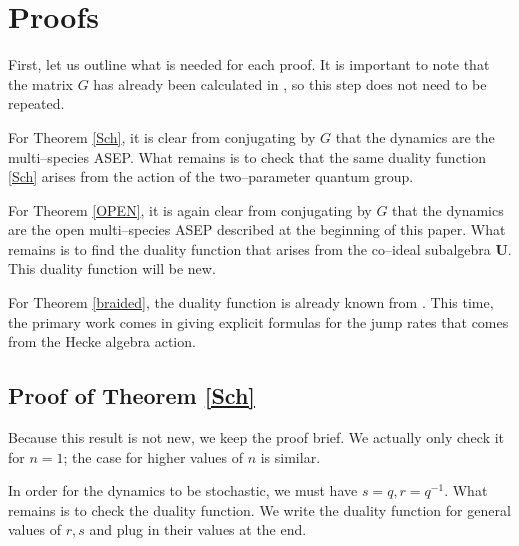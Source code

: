 \documentclass[12pt]{ximera}
\begin{document}
\section{Proofs}
First, let us outline what is needed for each proof. It is important to note that the matrix $G$ has already been calculated in \cite{KIMRN}, so this step does not need to be repeated. 

For Theorem \ref{Sch}, it is clear from conjugating by $G$ that the dynamics are the multi--species ASEP. What remains is to check that the same duality function \eqref{Sch} arises from the action of the two--parameter quantum group. 

For Theorem \ref{OPEN}, it is again clear from conjugating by $G$ that the dynamics are the open multi--species ASEP described at the beginning of this paper. What remains is to find the duality function that arises from the co--ideal subalgebra $\mathbf{U}$. This duality function will be new. 

For Theorem \ref{braided}, the duality function is already known from \cite{CGRS}. This time, the primary work comes in giving explicit formulas for the jump rates that comes from the Hecke algebra action.

\subsection{Proof of Theorem \ref{Sch} }
Because this result is not new, we keep the proof brief. We actually only check it for $n=1$; the case for higher values of $n$ is similar. 

In order for the dynamics to be stochastic, we must have $s=q,r=q^{-1}$. What remains is to check the duality function. We write the duality function for general values of $r,s$ and plug in their values at the end.
\end{document}
